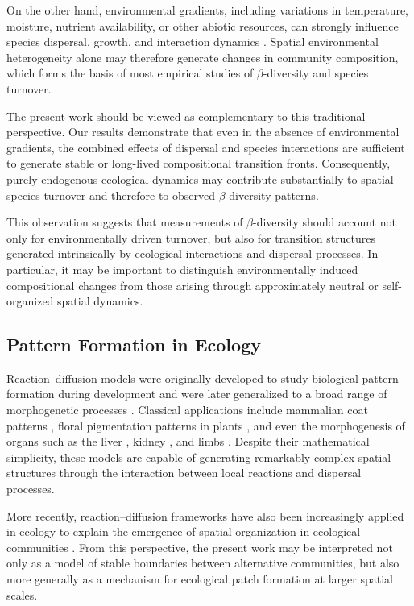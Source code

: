 On the other hand, environmental gradients, including variations in temperature, moisture, nutrient availability, or other abiotic resources, can strongly influence species dispersal, growth, and interaction dynamics \citep{hadeler_nonhomogeneous_1974, amarasekare_competitive_2003}. Spatial environmental heterogeneity alone may therefore generate changes in community composition, which forms the basis of most empirical studies of $\beta$-diversity and species turnover.

The present work should be viewed as complementary to this traditional perspective. Our results demonstrate that even in the absence of environmental gradients, the combined effects of dispersal and species interactions are sufficient to generate stable or long-lived compositional transition fronts. Consequently, purely endogenous ecological dynamics may contribute substantially to spatial species turnover and therefore to observed $\beta$-diversity patterns.

This observation suggests that measurements of $\beta$-diversity should account not only for environmentally driven turnover, but also for transition structures generated intrinsically by ecological interactions and dispersal processes. In particular, it may be important to distinguish environmentally induced compositional changes from those arising through approximately neutral or self-organized spatial dynamics.

\subsection{Pattern Formation in Ecology}

Reaction--diffusion models were originally developed to study biological pattern formation during development \citep{turing_chemical_1990} and were later generalized to a broad range of morphogenetic processes \citep{kondo_reaction-diffusion_2010}. Classical applications include mammalian coat patterns \citep{sick_wnt_2006,kaelin_specifying_2012,yamaguchi_pattern_2007}, floral pigmentation patterns in plants \citep{liang_taxon-specific_2023}, and even the morphogenesis of organs such as the liver \citep{de_langhe_dickkopf-1_2005}, kidney \citep{menshykau_kidney_2013}, and limbs \citep{raspopovic_digit_2014, onimaru_shift_2015}. Despite their mathematical simplicity, these models are capable of generating remarkably complex spatial structures through the interaction between local reactions and dispersal processes.

More recently, reaction--diffusion frameworks have also been increasingly applied in ecology to explain the emergence of spatial organization in ecological communities \citep{parshad_turing_2014, pichon_interplay_2024}. From this perspective, the present work may be interpreted not only as a model of stable boundaries between alternative communities, but also more generally as a mechanism for ecological patch formation at larger spatial scales.

